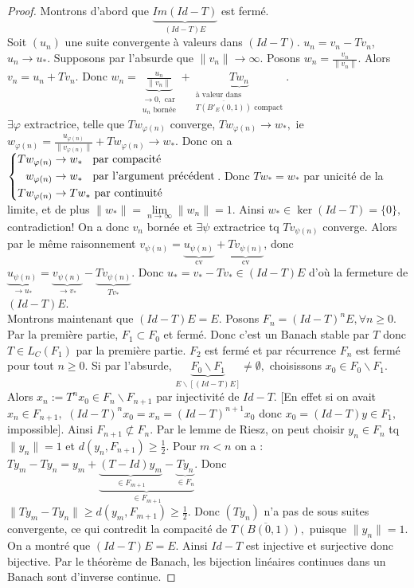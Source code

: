 \begin{proof}
    Montrons d'abord que $\underbrace{Im(Id-T)}_{(Id-T)E}$ est fermé.\\
    Soit $(u_n)$ une suite convergente à valeurs dans $(Id-T)$. $u_n=v_n-Tv_n$, $u_n\to u_*.$ Supposons par l'absurde que $\|v_n\|\to \infty .$ Posons $w_n=\frac{v_n}{\|v_n\|}.$ Alors $v_n=u_n+Tv_n.$ Donc $w_n=\underbrace{\frac{u_n}{\|v_n\|}}_{\substack{\to 0,\text{ car}\\u_n\text{ bornée}}}+\underbrace{Tw_n}_{\substack{\text{à valeur dans}\\\text{$\overline{T(B'_E(0,1))}$ compact}}}$.\\
    $\exists \varphi  $ extractrice, telle que $Tw_{\varphi (n)}$ converge, $Tw_{\varphi (n)}\to w_*,$ ie $w_{\varphi (n)}=\frac{u_{\varphi (n)}}{\|v_{\varphi (n)}\|}+Tw_{\varphi (n)}\to w_*.$ Donc on a
     $\left\{\begin{aligned}
             Tw_{\varphi (n)}&\to w_*\hspace{0.9em} \text{par compacité}\\
             w_{\varphi (n)}&\to w_* \hspace{0.9em} \text{par l'argument précédent}\\
         Tw_{\varphi (n)} &\to Tw_* \ \text{par continuité}
    \end{aligned}\right.$.
Donc $Tw_*=w_*$ par unicité de la limite, et de plus $\|w_*\|=\lim\limits_{n \to \infty} \|w_n\|=1.$ Ainsi $w_*\in \ker(Id-T)=\{0\} ,$ contradiction! On a donc $v_n$ bornée et $\exists \psi$ extractrice tq $Tv_{\psi(n)}$ converge. Alors par le même raisonnement $v_{\psi(n)}=\underbrace{u_{\psi(n)}}_{\text{cv}}+\underbrace{Tv_{\psi(n)}}_{\text{cv}}$, donc $\underbrace{u_{\psi(n)}}_{\to u_*}=\underbrace{v_{\psi(n)}}_{\to v_*}-\underbrace{Tv_{\psi(n)}}_{Tv_*}.$ Donc $u_*=v_*-Tv_*\in (Id-T)E$ d'où la fermeture de $(Id-T)E$.\\
Montrons maintenant que $(Id-T)E=E.$ Posons $F_n=\left( Id-T \right) ^nE,\forall n\ge 0. $ Par la première partie, $F_1\subset F_0$ et fermé. Donc c'est un Banach stable par $T$ donc $T\in L_C(F_1)$ par la première partie. $F_2$ est fermé et par récurrence $F_n$ est fermé pour tout $n\ge 0.$ Si par l'absurde, $\underbrace{F_0\backslash F_1}_{E\backslash [(Id-T)E]}\neq \emptyset ,$ choisissons $x_0\in F_0\backslash F_1$. Alors $x_n:=T^nx_0\in F_n\backslash F_{n+1}$ par injectivité de $Id-T.$ [En effet si on avait $x_n\in F_{n+1},$ $\left( Id-T \right) ^nx_0=x_n=\left( Id-T \right) ^{n+1}x_0$ donc $x_0=(Id-T)y\in F_1,$ impossible]. Ainsi $F_{n+1}\not\subset F_n.$ Par le lemme de Riesz, on peut choisir $y_n\in F_n$ tq $\|y_n\|=1$ et $d(y_n,F_{n+1})\ge \frac{1}{2}.$ Pour $m<n$ on a : $Ty_m-Ty_n =y_m+\underbrace{\underbrace{(T-Id)y_m}_{\in F_{m+1}}-\underbrace{Ty_n}_{\in F_n}}_{\in F_{m+1}}$. Donc $\|Ty_m-Ty_n\|\ge d(y_m,F_{m+1})\ge \frac{1}{2}.$ Donc $(Ty_n)$ n'a pas de sous suites convergente, ce qui contredit la compacité de $\overline{T(B(0,1))},$ puisque $\|y_n\|=1.$  \\
On a montré que $(Id-T)E=E.$ Ainsi $Id-T$ est injective et surjective donc bijective. Par le théorème de Banach, les bijection linéaires continues dans un Banach sont d'inverse continue.
\end{proof}
